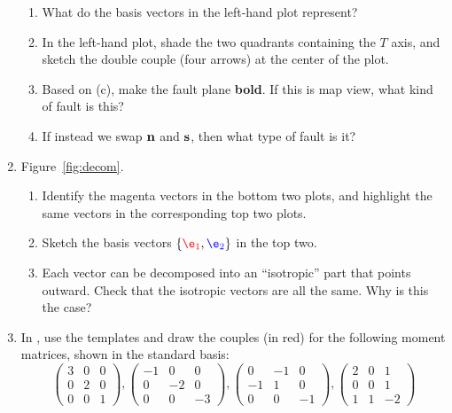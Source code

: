 \documentclass[11pt,titlepage,fleqn]{article}
\newcommand{\eone}{\textcolor{red}{\e_1}}
\newcommand{\etwo}{\textcolor{blue}{\e_2}}
\begin{document}
\begin{enumerate}
\begin{enumerate}
\item What do the basis vectors in the left-hand plot represent?

\item In the left-hand plot, shade the two quadrants containing the $T$ axis, and sketch the double couple (four arrows) at the center of the plot.

\item Based on (c), make the fault plane {\bf bold}. If this is map view, what kind of fault is this?

\item If instead we swap $\mbox{${\bf n}$}$ and $\mbox{${\bf s}$}$, then what type of fault is it?
\end{enumerate}


\item 
\label{prob:decom}
Figure~\ref{fig:decom}.
%
\begin{enumerate}
\item Identify the magenta vectors in the bottom two plots, and highlight the same vectors in the corresponding top two plots.
\item Sketch the basis vectors $\{\eone,\etwo\}$ in the top two.
\item Each vector can be decomposed into an ``isotropic'' part that points outward. Check that the isotropic vectors are all the same. Why is this the case?
\end{enumerate}


\item 
\label{prob:arrows}
In , use the templates and draw the couples (in red) for the following moment matrices, shown in the standard basis:
%
\begin{equation*}
\begin{pmatrix} 3 &  0 & 0 \\  0 & 2 & 0 \\ 0 & 0 &  1 \end{pmatrix},
\begin{pmatrix} -1 &  0 & 0 \\  0 & -2 & 0 \\ 0 & 0 & -3 \end{pmatrix},
\begin{pmatrix} 0 & -1 & 0 \\ -1 & 1 & 0 \\ 0 & 0 & -1 \end{pmatrix},
\begin{pmatrix} 2 &  0 & 1 \\  0 & 0 & 1 \\ 1 & 1 & -2 \end{pmatrix}
\end{equation*}


\end{enumerate}
\end{document}

